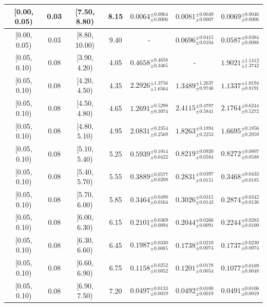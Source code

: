 \begin{longtable}{|c|c|c|c|c|c|c|}
\hline
[0.00, 0.05) & 0.03 & [7.50, 8.80) & 8.15 & $0.0064^{ \pm 0.0064 }_{ \pm 0.0006 }$ & $0.0081^{ \pm 0.0049 }_{ \pm 0.0007 }$ & $0.0069^{ \pm 0.0046 }_{ \pm 0.0006 }$ \\ 
\hline
[0.00, 0.05) & 0.03 & [8.80, 10.00) & 9.40 & - & $0.0696^{ \pm 0.0415 }_{ \pm 0.0104 }$ & $0.0587^{ \pm 0.0384 }_{ \pm 0.0088 }$ \\ 
\hline
[0.05, 0.10) & 0.08 & [3.90, 4.20) & 4.05 & $0.4658^{ \pm 0.4658 }_{ \pm 0.3365 }$ & - & $1.9021^{ \pm 1.1412 }_{ \pm 1.3742 }$ \\ 
\hline
[0.05, 0.10) & 0.08 & [4.20, 4.50) & 4.35 & $2.2926^{ \pm 1.3756 }_{ \pm 1.6564 }$ & $1.3489^{ \pm 1.2637 }_{ \pm 0.9746 }$ & $1.1337^{ \pm 1.0194 }_{ \pm 0.8191 }$ \\ 
\hline
[0.05, 0.10) & 0.08 & [4.50, 4.80) & 4.65 & $1.2691^{ \pm 0.5298 }_{ \pm 0.3074 }$ & $2.4115^{ \pm 0.4787 }_{ \pm 0.5841 }$ & $2.1764^{ \pm 0.6244 }_{ \pm 0.5272 }$ \\ 
\hline
[0.05, 0.10) & 0.08 & [4.80, 5.10) & 4.95 & $2.0831^{ \pm 0.2354 }_{ \pm 0.2569 }$ & $1.8263^{ \pm 0.1894 }_{ \pm 0.2253 }$ & $1.6695^{ \pm 0.1856 }_{ \pm 0.2059 }$ \\ 
\hline
[0.05, 0.10) & 0.08 & [5.10, 5.40) & 5.25 & $0.5939^{ \pm 0.1014 }_{ \pm 0.0422 }$ & $0.8219^{ \pm 0.0920 }_{ \pm 0.0584 }$ & $0.8272^{ \pm 0.0807 }_{ \pm 0.0588 }$ \\ 
\hline
[0.05, 0.10) & 0.08 & [5.40, 5.70) & 5.55 & $0.3889^{ \pm 0.0577 }_{ \pm 0.0208 }$ & $0.2831^{ \pm 0.0397 }_{ \pm 0.0151 }$ & $0.3468^{ \pm 0.0433 }_{ \pm 0.0185 }$ \\ 
\hline
[0.05, 0.10) & 0.08 & [5.70, 6.00) & 5.85 & $0.3464^{ \pm 0.0498 }_{ \pm 0.0164 }$ & $0.3026^{ \pm 0.0315 }_{ \pm 0.0143 }$ & $0.2874^{ \pm 0.0342 }_{ \pm 0.0136 }$ \\ 
\hline
[0.05, 0.10) & 0.08 & [6.00, 6.30) & 6.15 & $0.2101^{ \pm 0.0369 }_{ \pm 0.0094 }$ & $0.2044^{ \pm 0.0266 }_{ \pm 0.0091 }$ & $0.2244^{ \pm 0.0283 }_{ \pm 0.0100 }$ \\ 
\hline
[0.05, 0.10) & 0.08 & [6.30, 6.60) & 6.45 & $0.1987^{ \pm 0.0330 }_{ \pm 0.0085 }$ & $0.1738^{ \pm 0.0210 }_{ \pm 0.0074 }$ & $0.1737^{ \pm 0.0230 }_{ \pm 0.0074 }$ \\ 
\hline
[0.05, 0.10) & 0.08 & [6.60, 6.90) & 6.75 & $0.1158^{ \pm 0.0252 }_{ \pm 0.0052 }$ & $0.1201^{ \pm 0.0178 }_{ \pm 0.0054 }$ & $0.1077^{ \pm 0.0169 }_{ \pm 0.0048 }$ \\ 
\hline
[0.05, 0.10) & 0.08 & [6.90, 7.50) & 7.20 & $0.0497^{ \pm 0.0133 }_{ \pm 0.0019 }$ & $0.0492^{ \pm 0.0100 }_{ \pm 0.0019 }$ & $0.0491^{ \pm 0.0106 }_{ \pm 0.0019 }$ \\ 

\end{longtable}
